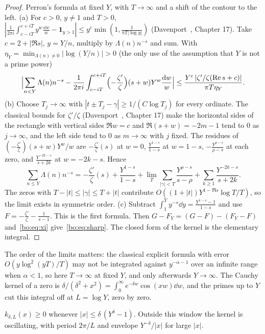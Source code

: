 \begin{proof}
Perron's formula at fixed $Y$, with $T\to\infty$ and a shift of the contour to the left. (a) For $c>0$, $y\ne1$ and $T>0$, $|\frac1{2\pi i}\int_{c-iT}^{c+iT}y^w\frac{\dd w}w-\mathbf 1_{y>1}|\le y^c\min(1,\frac1{\pi T|\log y|})$ (Davenport~\cite{Davenport}, Chapter 17). Take $c=2+|\Re s|$, $y=Y/n$, multiply by $\Lambda(n)n^{-s}$ and sum. With $\eta_Y=\min_{\Lambda(n)\ne0}|\log(Y/n)|>0$ (the only use of the assumption that $Y$ is not a prime power)
\[
\Bigl|\sum_{n<Y}\Lambda(n)n^{-s}-\frac1{2\pi i}\int_{c-iT}^{c+iT}\Bigl(-\frac{\zeta'}{\zeta}\Bigr)(s+w)Y^w\frac{\mathrm{d} w}w\Bigr|\le\frac{Y^c\,|\zeta'/\zeta(\operatorname{Re} s+c)|}{\pi T\eta_Y}.
\]
(b) Choose $T_j\to\infty$ with $|t\pm T_j-\gamma|\ge1/(C\log T_j)$ for every ordinate. The classical bounds for $\zeta'/\zeta$ (Davenport~\cite{Davenport}, Chapter 17) make the horizontal sides of the rectangle with vertical sides $\Re w=c$ and $\Re(s+w)=-2m-1$ tend to $0$ as $j\to\infty$, and the left side tend to $0$ as $m\to\infty$ with $j$ fixed. The residues of $(-\frac{\zeta'}{\zeta})(s+w)Y^w/w$ are $-\frac{\zeta'}{\zeta}(s)$ at $w=0$, $\frac{Y^{1-s}}{1-s}$ at $w=1-s$, $-\frac{Y^{\rho-s}}{\rho-s}$ at each zero, and $\frac{Y^{-2k-s}}{s+2k}$ at $w=-2k-s$. Hence
\[
\sum_{n\le Y}\Lambda(n)n^{-s}=-\frac{\zeta'}{\zeta}(s)+\frac{Y^{1-s}}{1-s}+\lim_{T}\sum_{|\gamma|<T}\frac{Y^{\rho-s}}{s-\rho}+\sum_{k\ge1}\frac{Y^{-2k-s}}{s+2k}.
\]
The zeros with $T-|t|\le|\gamma|\le T+|t|$ contribute $O((1+|t|)Y^{1-\Re s}\log T/T)$, so the limit exists in symmetric order.
(c) Subtract $\int_1^Yy^{-s}\dd y=\frac{Y^{1-s}-1}{1-s}$ and use $F=-\frac{\zeta'}{\zeta}-\frac1{s-1}$. This is the first formula. Then $G-F_Y=(G-F)-(F_Y-F)$ and~\eqref{bo:eq:xi} give~\eqref{bo:eq:sharp}. The closed form of the kernel is the elementary integral.
\end{proof}

The order of the limits matters: the classical explicit formula with error $O(y\log^2(yT)/T)$ may not be integrated against $y^{-\alpha-1}$ over an infinite range when $\alpha<1$, so here $T\to\infty$ at fixed $Y$, and only afterwards $Y\to\infty$. The Cauchy kernel of a zero is $\delta/(\delta^2+x^2)=\int_0^\infty e^{-\delta w}\cos(xw)\dd w$, and the primes up to $Y$ cut this integral off at $L=\log Y$, zero by zero.

\begin{corollary}\label{bo:cor:window}
$k_{\delta,L}(x)\ge0$ whenever $|x|\le\delta\,(Y^{\delta}-1)$. Outside this window the kernel is oscillating, with period $2\pi/L$ and envelope $Y^{-\delta}/|x|$ for large $|x|$.
\end{corollary}

